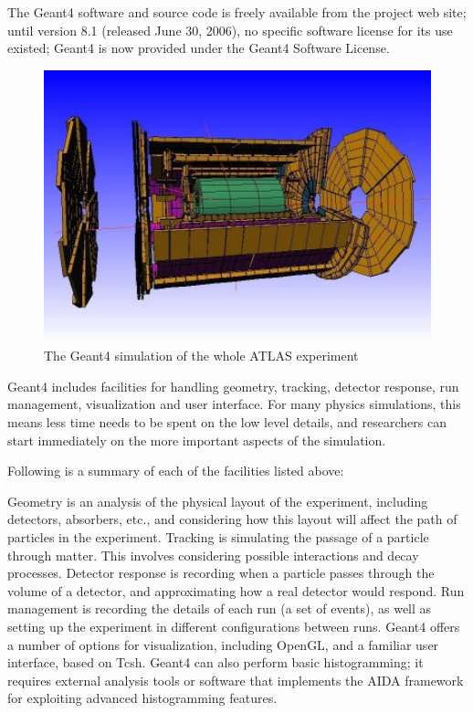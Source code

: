\documentclass[12pt, a4paper,titlepage]{article}
\numberwithin{equation}{section}
\numberwithin{figure}{section}
\begin{document}
The Geant4 software and source code is freely available from the project web site; until version 8.1 (released June 30, 2006), no specific software license for its use existed; Geant4 is now provided under the Geant4 Software License.

\begin{figure}[H]
\centering
\includegraphics[width=130.0mm]{images/AtlasHalf.jpg}
\caption{The Geant4 simulation of the whole ATLAS experiment}
\end{figure}

Geant4 includes facilities for handling geometry, tracking, detector response, run management, visualization and user interface. For many physics simulations, this means less time needs to be spent on the low level details, and researchers can start immediately on the more important aspects of the simulation.

Following is a summary of each of the facilities listed above:

Geometry is an analysis of the physical layout of the experiment, including detectors, absorbers, etc., and considering how this layout will affect the path of particles in the experiment.
Tracking is simulating the passage of a particle through matter. This involves considering possible interactions and decay processes.
Detector response is recording when a particle passes through the volume of a detector, and approximating how a real detector would respond.
Run management is recording the details of each run (a set of events), as well as setting up the experiment in different configurations between runs.
Geant4 offers a number of options for visualization, including OpenGL, and a familiar user interface, based on Tcsh.
Geant4 can also perform basic histogramming; it requires external analysis tools or software that implements the AIDA framework for exploiting advanced histogramming features.
\end{document}
